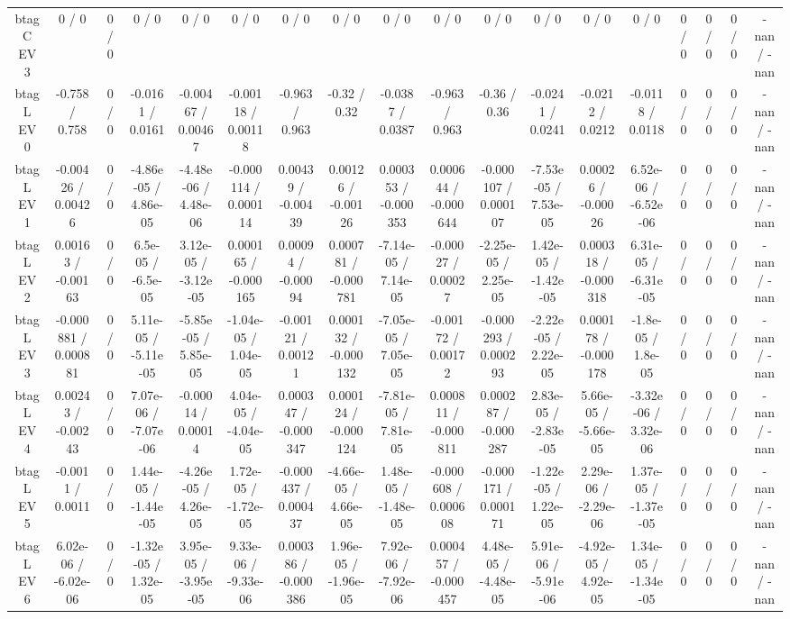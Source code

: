 \documentclass[10pt]{article}
\begin{document}
\begin{table}[htbp]
\begin{center}
\begin{tabular}{|c|c|c|c|c|c|c|c|c|c|c|c|c|c|c|c|c|c|}
  btag C EV 3 & 0 / 0 & 0 / 0 & 0 / 0 & 0 / 0 & 0 / 0 & 0 / 0 & 0 / 0 & 0 / 0 & 0 / 0 & 0 / 0 & 0 / 0 & 0 / 0 & 0 / 0 & 0 / 0 & 0 / 0 & 0 / 0 & -nan / -nan \\ 
  btag L EV 0 & -0.758 / 0.758 & 0 / 0 & -0.0161 / 0.0161 & -0.00467 / 0.00467 & -0.00118 / 0.00118 & -0.963 / 0.963 & -0.32 / 0.32 & -0.0387 / 0.0387 & -0.963 / 0.963 & -0.36 / 0.36 & -0.0241 / 0.0241 & -0.0212 / 0.0212 & -0.0118 / 0.0118 & 0 / 0 & 0 / 0 & 0 / 0 & -nan / -nan \\ 
  btag L EV 1 & -0.00426 / 0.00426 & 0 / 0 & -4.86e-05 / 4.86e-05 & -4.48e-06 / 4.48e-06 & -0.000114 / 0.000114 & 0.00439 / -0.00439 & 0.00126 / -0.00126 & 0.000353 / -0.000353 & 0.000644 / -0.000644 & -0.000107 / 0.000107 & -7.53e-05 / 7.53e-05 & 0.00026 / -0.00026 & 6.52e-06 / -6.52e-06 & 0 / 0 & 0 / 0 & 0 / 0 & -nan / -nan \\ 
  btag L EV 2 & 0.00163 / -0.00163 & 0 / 0 & 6.5e-05 / -6.5e-05 & 3.12e-05 / -3.12e-05 & 0.000165 / -0.000165 & 0.00094 / -0.00094 & 0.000781 / -0.000781 & -7.14e-05 / 7.14e-05 & -0.00027 / 0.00027 & -2.25e-05 / 2.25e-05 & 1.42e-05 / -1.42e-05 & 0.000318 / -0.000318 & 6.31e-05 / -6.31e-05 & 0 / 0 & 0 / 0 & 0 / 0 & -nan / -nan \\ 
  btag L EV 3 & -0.000881 / 0.000881 & 0 / 0 & 5.11e-05 / -5.11e-05 & -5.85e-05 / 5.85e-05 & -1.04e-05 / 1.04e-05 & -0.00121 / 0.00121 & 0.000132 / -0.000132 & -7.05e-05 / 7.05e-05 & -0.00172 / 0.00172 & -0.000293 / 0.000293 & -2.22e-05 / 2.22e-05 & 0.000178 / -0.000178 & -1.8e-05 / 1.8e-05 & 0 / 0 & 0 / 0 & 0 / 0 & -nan / -nan \\ 
  btag L EV 4 & 0.00243 / -0.00243 & 0 / 0 & 7.07e-06 / -7.07e-06 & -0.00014 / 0.00014 & 4.04e-05 / -4.04e-05 & 0.000347 / -0.000347 & 0.000124 / -0.000124 & -7.81e-05 / 7.81e-05 & 0.000811 / -0.000811 & 0.000287 / -0.000287 & 2.83e-05 / -2.83e-05 & 5.66e-05 / -5.66e-05 & -3.32e-06 / 3.32e-06 & 0 / 0 & 0 / 0 & 0 / 0 & -nan / -nan \\ 
  btag L EV 5 & -0.0011 / 0.0011 & 0 / 0 & 1.44e-05 / -1.44e-05 & -4.26e-05 / 4.26e-05 & 1.72e-05 / -1.72e-05 & -0.000437 / 0.000437 & -4.66e-05 / 4.66e-05 & 1.48e-05 / -1.48e-05 & -0.000608 / 0.000608 & -0.000171 / 0.000171 & -1.22e-05 / 1.22e-05 & 2.29e-06 / -2.29e-06 & 1.37e-05 / -1.37e-05 & 0 / 0 & 0 / 0 & 0 / 0 & -nan / -nan \\ 
  btag L EV 6 & 6.02e-06 / -6.02e-06 & 0 / 0 & -1.32e-05 / 1.32e-05 & 3.95e-05 / -3.95e-05 & 9.33e-06 / -9.33e-06 & 0.000386 / -0.000386 & 1.96e-05 / -1.96e-05 & 7.92e-06 / -7.92e-06 & 0.000457 / -0.000457 & 4.48e-05 / -4.48e-05 & 5.91e-06 / -5.91e-06 & -4.92e-05 / 4.92e-05 & 1.34e-05 / -1.34e-05 & 0 / 0 & 0 / 0 & 0 / 0 & -nan / -nan \\ 

\end{tabular}
\end{center}
\end{table}
\end{document}

